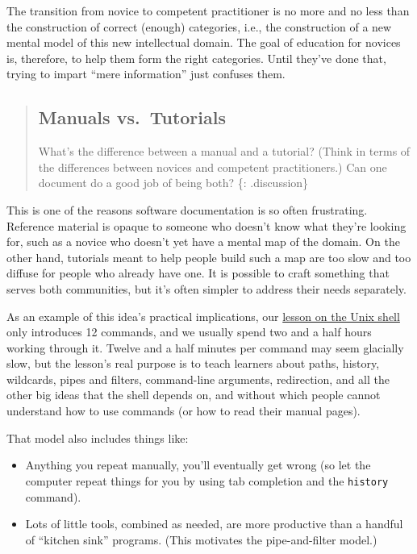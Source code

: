 The transition from novice to competent practitioner is no more and no
less than the construction of correct (enough) categories, i.e., the
construction of a new mental model of this new intellectual domain. The
goal of education for novices is, therefore, to help them form the right
categories. Until they've done that, trying to impart ``mere
information'' just confuses them.

\begin{quote}
\subsection{Manuals vs.~Tutorials}\label{manuals-vs.tutorials}

What's the difference between a manual and a tutorial? (Think in terms
of the differences between novices and competent practitioners.) Can one
document do a good job of being both? \{: .discussion\}
\end{quote}

This is one of the reasons software documentation is so often
frustrating. Reference material is opaque to someone who doesn't know
what they're looking for, such as a novice who doesn't yet have a mental
map of the domain. On the other hand, tutorials meant to help people
build such a map are too slow and too diffuse for people who already
have one. It is possible to craft something that serves both
communities, but it's often simpler to address their needs separately.

As an example of this idea's practical implications, our
\href{http://swcarpentry.github.io/shell-novice/}{lesson on the Unix
shell} only introduces 12 commands, and we usually spend two and a half
hours working through it. Twelve and a half minutes per command may seem
glacially slow, but the lesson's real purpose is to teach learners about
paths, history, wildcards, pipes and filters, command-line arguments,
redirection, and all the other big ideas that the shell depends on, and
without which people cannot understand how to use commands (or how to
read their manual pages).

That model also includes things like:

\begin{itemize}
\itemsep1pt\parskip0pt
\item
  Anything you repeat manually, you'll eventually get wrong (so let the
  computer repeat things for you by using tab completion and the
  \texttt{history} command).
\item
  Lots of little tools, combined as needed, are more productive than a
  handful of ``kitchen sink'' programs. (This motivates the
  pipe-and-filter model.)
\end{itemize}

